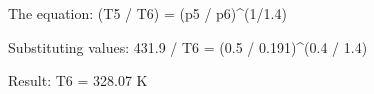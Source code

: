 The equation:  
(T5 / T6) = (p5 / p6)^(1/1.4)  

Substituting values:  
431.9 / T6 = (0.5 / 0.191)^(0.4 / 1.4)  

Result:  
T6 = 328.07 K